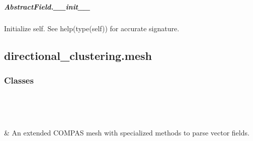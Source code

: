 \documentclass[letterpaper,10pt,english]{sphinxmanual}
\begin{document}
\begin{fulllineitems}
\subparagraph{AbstractField.\_\_init\_\_}
\label{\detokenize{api/generated/directional_clustering.fields.AbstractField.__init__:abstractfield-init}}\label{\detokenize{api/generated/directional_clustering.fields.AbstractField.__init__::doc}}

\begin{fulllineitems}
\label{\detokenize{api/generated/directional_clustering.fields.AbstractField.__init__:directional_clustering.fields.AbstractField.__init__}}
Initialize self.  See help(type(self)) for accurate signature.

\end{fulllineitems}


\end{fulllineitems}

\label{\detokenize{api/directional_clustering.mesh:module-directional_clustering.mesh}}

\subsection{directional\_clustering.mesh}
\label{\detokenize{api/directional_clustering.mesh:directional-clustering-mesh}}\label{\detokenize{api/directional_clustering.mesh::doc}}

\subsubsection{Classes}
\label{\detokenize{api/directional_clustering.mesh:classes}}

\begin{savenotes}\sphinxatlongtablestart\begin{longtable}[c]{}
\hline

\endfirsthead

%
{}\\
\hline

\endhead

\hline
{}\\
\endfoot

\endlastfoot

{\hyperref[\detokenize{api/generated/directional_clustering.mesh.MeshPlus:directional_clustering.mesh.MeshPlus}]{}}
&
An extended COMPAS mesh with specialized methods to parse vector fields.
\\
\hline
\end{longtable}\sphinxatlongtableend\end{savenotes}
\end{document}
